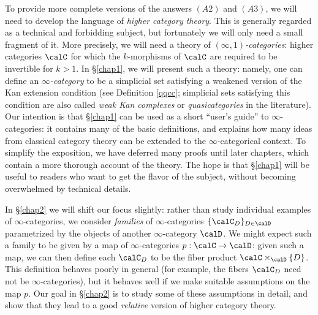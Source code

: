 To provide more complete versions of the answers $(A2)$ and $(A3)$, we will need to develop the language of {\em higher category theory}. This is generally regarded as a technical and forbidding subject, but fortunately we will only need a small fragment of it. More precisely, we will need a theory of
{\it $(\infty,1)$-categories}: higher categories $\calC$ for which the $k$-morphisms of $\calC$ are required to be invertible for $k > 1$. In \S \ref{chap1}, we will present such a theory:
namely, one can define an {\it $\infty$-category} to be a simplicial set
satisfying a weakened version of the Kan extension condition (see Definition \ref{qqcc}; simplicial sets satisfying this condition are also called {\it weak Kan complexes} or {\it quasicategories} in the literature). 
Our intention is that \S \ref{chap1} can be used as a short ``user's guide'' to $\infty$-categories:
it contains many of the basic definitions, and explains how many ideas from classical category theory can be extended to the $\infty$-categorical context. To simplify the exposition, we have deferred many proofs until later chapters, which contain a more thorough account of the theory.
The hope is that \S \ref{chap1} will be useful to readers who want to get the flavor of the subject, without becoming overwhelmed by technical details.

In \S \ref{chap2} we will shift our focus slightly: rather than study individual examples of $\infty$-categories, we consider {\em families} of $\infty$-categories $\{ \calC_{D} \}_{ D \in \calD}$ parametrized by the objects of another $\infty$-category $\calD$. We might expect such a family to be given by a map of $\infty$-categories $p: \calC \rightarrow \calD$: given such a map, we can then define each $\calC_{D}$ to be
the fiber product $\calC \times_{\calD} \{D\}$. This definition behaves poorly in general
(for example, the fibers $\calC_{D}$ need not be $\infty$-categories), but it behaves well if
we make suitable assumptions on the map $p$. Our goal in \S \ref{chap2} is to study some of these assumptions in detail, and show that they lead to a good {\em relative} version of higher category theory.

